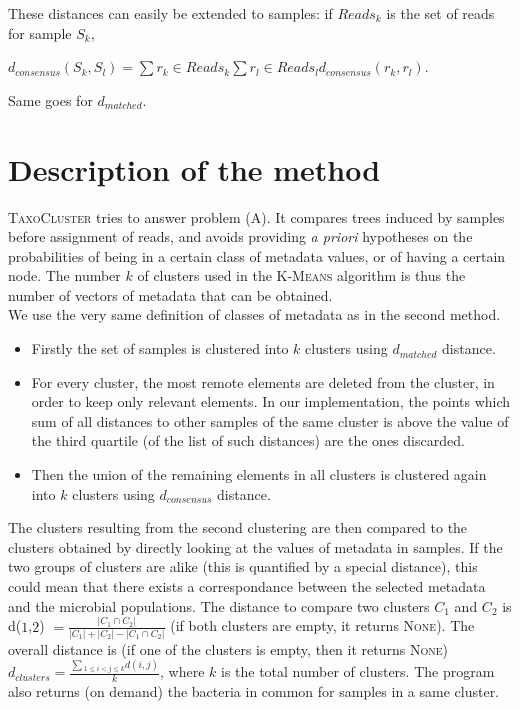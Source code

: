 \documentclass{report}
\begin{document}
\item These distances can easily be extended to samples: if $Reads_{k}$ is the set of reads for sample $S_{k}$,\\
\begin{center}
$d_{consensus}(S_{k},S_{l}) = \sum{r_{k} \in Reads_{k}}{\sum{r_{l} \in Reads_{l}}{d_{consensus}(r_{k},r_{l})}}$.
\end{center} 

Same goes for $d_{matched}$.

\section{Description of the method}

\textsc{TaxoCluster} tries to answer problem (\textsc{A}). It compares trees induced by samples before assignment of reads, and avoids providing \emph{a priori} hypotheses on the probabilities of being in a certain class of metadata values, or of having a certain node. The number $k$ of clusters used in the \textsc{K-Means} algorithm is thus the number of vectors of metadata that can be obtained.\\

We use the very same definition of classes of metadata as in the second method.

\begin{itemize}
\item Firstly the set of samples is clustered into $k$ clusters using $d_{matched}$ distance. 
\item For every cluster, the most remote elements are deleted from the cluster, in order to keep only relevant elements. In our implementation, the points which sum of all distances to other samples of the same cluster is above the value of the third quartile (of the list of such distances) are the ones discarded.
\item Then the union of the remaining elements in all clusters is clustered again into $k$ clusters using $d_{consensus}$ distance.
\end{itemize}

The clusters resulting from the second clustering are then compared to the clusters obtained by directly looking at the values of metadata in samples. If the two groups of clusters are alike (this is quantified by a special distance), this could mean that there exists a correspondance between the selected metadata and the microbial populations. The distance to compare two clusters \textsc{$C_{1}$} and \textsc{$C_{2}$} is d($1$,$2$) $= \frac{|C_{1} \cap C_{2}|}{|C_{1}| + |C_{2}| - |C_{1} \cap C_{2}|} $ (if both clusters are empty, it returns \textsc{None}). The overall distance is (if one of the clusters is empty, then it returns \textsc{None}) $d_{clusters} = \frac{\sum{_{1 \le i < j \le k}}{d(i,j)}}{k}$, where $k$ is the total number of clusters. The program also returns (on demand) the bacteria in common for samples in a same cluster.\\
\end{document}
